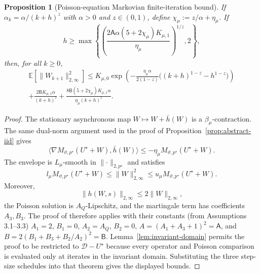 \documentclass{article}
\newtheorem{proposition}[theorem]{Proposition}
\begin{document}
\begin{proposition}[Poisson-equation Markovian finite-iteration bound]
If $\alpha_k=\alpha/(k+h)^z$ with $\alpha>0$ and $z\in(0,1)$, define $\chi_\mu:=z/\alpha+\eta_\mu$. If
\begin{equation}
h\ge\max\left\{\left(\frac{2\mathsf A\alpha(5+2\chi_\mu)K_{\mu,1}}{\eta_\mu}\right)^{1/z},2\right\},
\end{equation}
then, for all $k\ge0$,
\begin{equation}
\begin{gathered}
\mathbb E\left[\lVert W_{k+1}\rVert_{2,\infty}^2\right]\le
K_{\mu,0}\exp\left(-\frac{\eta_\mu\alpha}{2(1-z)}
\bigl((k+h)^{1-z}-h^{1-z}\bigr)\right)\\
+\frac{2\mathsf B K_{\mu,1}\alpha}{(k+h)^z}
+\frac{8\mathsf B(5+2\chi_\mu)K_{\mu,1}\alpha}{\eta_\mu(k+h)^z}.
\end{gathered}
\end{equation}
\end{proposition}

\begin{proof}
The stationary asynchronous map $W\mapsto W+\bar h(W)$ is a $\beta_\mu$-contraction. The same dual-norm argument used in the proof of Proposition~\ref{prop:abstract-iid} gives
\begin{equation}
\langle\nabla M_{\vartheta,p^\star}(U^\star+W),\bar h(W)\rangle\le-\eta_\mu M_{\vartheta,p^\star}(U^\star+W).
\end{equation}
The envelope is $L_\mu$-smooth in $\lVert\cdot\rVert_{2,p^\star}$ and satisfies
\begin{equation}
l_\mu M_{\vartheta,p^\star}(U^\star+W)\le\lVert W\rVert_{2,\infty}^2\le u_\mu M_{\vartheta,p^\star}(U^\star+W).
\end{equation}
Moreover,
\begin{equation}
\lVert h(W,s)\rVert_{2,\infty}\le2\lVert W\rVert_{2,\infty},
\end{equation}
the Poisson solution is $A_Q$-Lipschitz, and the martingale term has coefficients $A_3,B_3$. The proof of \citet[Theorem A.2]{haque2024stochastic} therefore applies with their constants (from Assumptions 3.1–3.3) $A_1=2$, $B_1=0$, $A_2=A_Q$, $B_2=0$, $A=(A_1+A_3+1)^2=\mathsf A$, and $B=2(B_1+B_3+B_2/A_2)^2=\mathsf B$. Lemma~\ref{lem:invariant-domain} permits the proof to be restricted to $\mathcal D-U^\star$ because every operator and Poisson comparison is evaluated only at iterates in the invariant domain. Substituting the three step-size schedules into that theorem gives the displayed bounds.
\end{proof}
\end{document}
